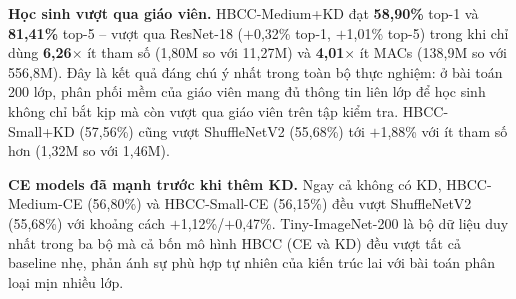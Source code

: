 \documentclass[conference]{IEEEtran}
\begin{document}
\begin{table}[ht!]
  \caption{So sánh trên Tiny-ImageNet-200. \textbf{In đậm}: tốt nhất
           \emph{tổng thể} (kể cả ResNet-18). Mũi tên CE$\to$KD:
           cùng kiến trúc.}
  \label{tab:tin}
  \centering
  \renewcommand{\arraystretch}{1.15}
\end{table}

\noindent\textbf{Học sinh vượt qua giáo viên.}
HBCC-Medium+KD đạt \textbf{58,90\%} top-1 và \textbf{81,41\%} top-5
-- vượt qua ResNet-18 ($+$0,32\% top-1, $+$1,01\% top-5) trong khi
chỉ dùng \textbf{6,26}$\times$ ít tham số (1,80M so với 11,27M) và
\textbf{4,01}$\times$ ít MACs (138,9M so với 556,8M). Đây là kết
quả đáng chú ý nhất trong toàn bộ thực nghiệm: ở bài toán 200 lớp,
phân phối mềm của giáo viên mang đủ thông tin liên lớp để học sinh
không chỉ bắt kịp mà còn vượt qua giáo viên trên tập kiểm tra.
HBCC-Small+KD (57,56\%) cũng vượt ShuffleNetV2 (55,68\%) tới
$+$1,88\% với ít tham số hơn (1,32M so với 1,46M).

\noindent\textbf{CE models đã mạnh trước khi thêm KD.}
Ngay cả không có KD, HBCC-Medium-CE (56,80\%) và HBCC-Small-CE
(56,15\%) đều vượt ShuffleNetV2 (55,68\%) với khoảng cách
$+$1,12\%/$+$0,47\%. Tiny-ImageNet-200 là bộ dữ liệu duy nhất trong
ba bộ mà cả bốn mô hình HBCC (CE và KD) đều vượt tất cả baseline
nhẹ, phản ánh sự phù hợp tự nhiên của kiến trúc lai với bài toán
phân loại mịn nhiều lớp.
\end{document}
